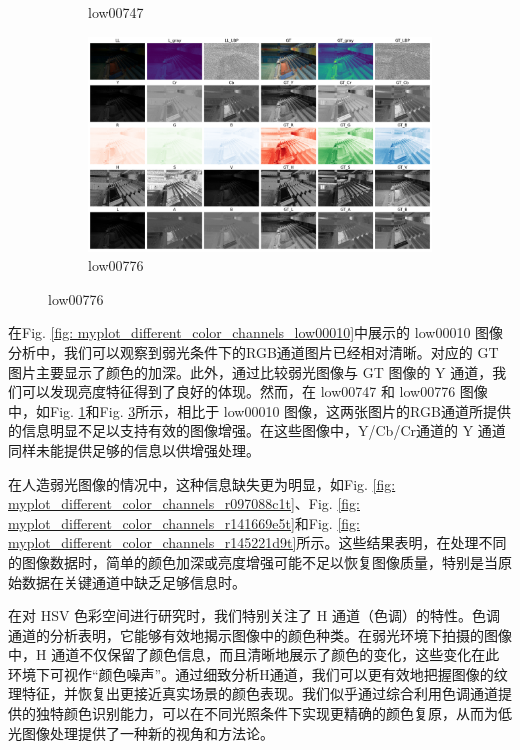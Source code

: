 \documentclass[a4paper]{ctexart}
\begin{document}
\begin{figure}[htbp]
\begin{subfigure}{0.3\textwidth}
				\captionsetup{font=scriptsize}
				\caption{low00747}
				\label{fig: myplot_different_color_channels_low00747}	
			\end{subfigure}
			\begin{subfigure}{0.3\textwidth}
				\includegraphics[width=\linewidth]{picture/LLIE/Experiment/myplot_different_color_channels_low00776}
				\captionsetup{font=scriptsize}
				\caption{low00776}
				\label{fig: myplot_different_color_channels_low00776}	
			\end{subfigure}
		\end{figure}
		
		\FloatBarrier
		
		在Fig. \ref{fig: myplot_different_color_channels_low00010}中展示的 low00010 图像分析中，我们可以观察到弱光条件下的RGB通道图片已经相对清晰。对应的 GT 图片主要显示了颜色的加深。此外，通过比较弱光图像与 GT 图像的 Y 通道，我们可以发现亮度特征得到了良好的体现。然而，在 low00747 和 low00776 图像中，如Fig. \ref{fig: myplot_different_color_channels_low00747}和Fig. \ref{fig: myplot_different_color_channels_low00776}所示，相比于 low00010 图像，这两张图片的RGB通道所提供的信息明显不足以支持有效的图像增强。在这些图像中，Y/Cb/Cr通道的 Y 通道同样未能提供足够的信息以供增强处理。
		
		在人造弱光图像的情况中，这种信息缺失更为明显，如Fig. \ref{fig: myplot_different_color_channels_r097088c1t}、Fig. \ref{fig: myplot_different_color_channels_r141669e5t}和Fig. \ref{fig: myplot_different_color_channels_r145221d9t}所示。这些结果表明，在处理不同的图像数据时，简单的颜色加深或亮度增强可能不足以恢复图像质量，特别是当原始数据在关键通道中缺乏足够信息时。
		
		
		在对 HSV 色彩空间进行研究时，我们特别关注了 H 通道（色调）的特性。色调通道的分析表明，它能够有效地揭示图像中的颜色种类。在弱光环境下拍摄的图像中，H 通道不仅保留了颜色信息，而且清晰地展示了颜色的变化，这些变化在此环境下可视作“颜色噪声”。通过细致分析H通道，我们可以更有效地把握图像的纹理特征，并恢复出更接近真实场景的颜色表现。我们似乎通过综合利用色调通道提供的独特颜色识别能力，可以在不同光照条件下实现更精确的颜色复原，从而为低光图像处理提供了一种新的视角和方法论。
		
\end{document}
